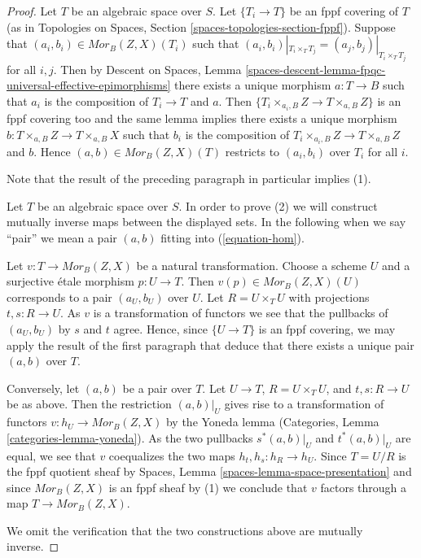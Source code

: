 \documentclass{stacks-project}
\theoremstyle{plain}
\theoremstyle{definition}
\theoremstyle{remark}
\numberwithin{equation}{subsection}
\begin{document}
\begin{proof}
Let $T$ be an algebraic space over $S$. Let $\{T_i \to T\}$ be an fppf
covering of $T$ (as in
Topologies on Spaces, Section \ref{spaces-topologies-section-fppf}).
Suppose that $(a_i, b_i) \in \mathit{Mor}_B(Z, X)(T_i)$ such
that $(a_i, b_i)|_{T_i \times_T T_j} = (a_j, b_j)|_{T_i \times_T T_j}$
for all $i, j$. Then by
Descent on Spaces,
Lemma \ref{spaces-descent-lemma-fpqc-universal-effective-epimorphisms}
there exists a unique morphism $a : T \to B$ such that $a_i$ is the
composition of $T_i \to T$ and $a$. Then
$\{T_i \times_{a_i, B} Z \to T \times_{a, B} Z\}$ is an fppf covering
too and the same lemma implies there exists a unique morphism
$b : T \times_{a, B} Z \to T \times_{a, B} X$ such that $b_i$ is the
composition of $T_i \times_{a_i, B} Z \to T \times_{a, B} Z$ and $b$. Hence
$(a, b) \in \mathit{Mor}_B(Z, X)(T)$ restricts to $(a_i, b_i)$
over $T_i$ for all $i$.

\medskip\noindent
Note that the result of the preceding paragraph in particular implies (1).

\medskip\noindent
Let $T$ be an algebraic space over $S$. In order to prove (2) we will
construct mutually inverse maps between the displayed sets. In the
following when we say ``pair'' we mean a pair $(a, b)$ fitting
into (\ref{equation-hom}).

\medskip\noindent
Let $v : T \to \mathit{Mor}_B(Z, X)$ be a natural transformation.
Choose a scheme $U$ and a surjective \'etale morphism $p : U \to T$.
Then $v(p) \in \mathit{Mor}_B(Z, X)(U)$ corresponds to a pair $(a_U, b_U)$
over $U$. Let $R = U \times_T U$ with projections $t, s : R \to U$.
As $v$ is a transformation of functors we see that the pullbacks of
$(a_U, b_U)$ by $s$ and $t$ agree. Hence, since $\{U \to T\}$ is an
fppf covering, we may apply the result of the first paragraph that
deduce that there exists a unique pair $(a, b)$ over $T$.

\medskip\noindent
Conversely, let $(a, b)$ be a pair over $T$.
Let $U \to T$, $R = U \times_T U$, and $t, s : R \to U$ be as
above. Then the restriction $(a, b)|_U$ gives rise to a
transformation of functors $v : h_U \to \mathit{Mor}_B(Z, X)$ by the
Yoneda lemma
(Categories, Lemma \ref{categories-lemma-yoneda}).
As the two pullbacks $s^*(a, b)|_U$ and $t^*(a, b)|_U$
are equal, we see that $v$ coequalizes the two maps
$h_t, h_s : h_R \to h_U$. Since $T = U/R$ is the fppf quotient sheaf by
Spaces, Lemma \ref{spaces-lemma-space-presentation}
and since $\mathit{Mor}_B(Z, X)$ is an fppf sheaf by (1) we conclude
that $v$ factors through a map $T \to \mathit{Mor}_B(Z, X)$.

\medskip\noindent
We omit the verification that the two constructions above are mutually
inverse.
\end{proof}
\end{document}
